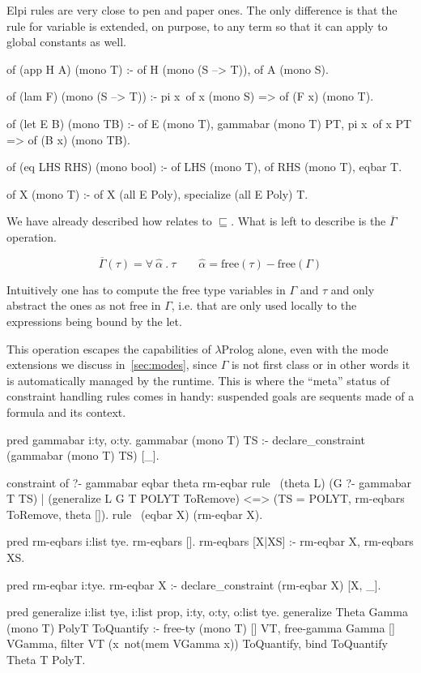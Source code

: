 \documentclass[a4paper, 11pt]{book}
\begin{document}
Elpi rules are very close to pen and paper ones. The only difference is that
the rule for variable is extended, on purpose, to any term so that it
can apply to global constants as well.

\begin{elpicode}
of (app H A) (mono T) :-
  of H (mono (S --> T)),
  of A (mono S).

of (lam F) (mono (S --> T)) :-
  pi x\ of x (mono S) => of (F x) (mono T).

of (let E B) (mono TB) :-
  of E (mono T),
  gammabar (mono T) PT,
  pi x\ of x PT => of (B x) (mono TB).

of (eq LHS RHS) (mono bool) :-
  of LHS (mono T),
  of RHS (mono T),
  eqbar T.

of X (mono T) :- of X (all E Poly), specialize (all E Poly) T.
\end{elpicode}

We have already described how  relates to $\sqsubseteq$.
What is left to describe is the $\overline{\Gamma}$ operation.
  
$$
\overline{\Gamma}(\tau) = \forall\ \hat{\alpha}\ .\ \tau \quad\quad \hat{\alpha} = \textrm{free}(\tau) - \textrm{free}(\Gamma)
$$

Intuitively one has to compute the free type variables in $\Gamma$ and $\tau$
and only abstract the ones as not free in $\Gamma$, i.e. that are only used
locally to the expressions being bound by the let.

This operation escapes the capabilities of $\lambda$Prolog alone, even with
the mode extensions we discuss in~\ref{sec:modes}, since $\Gamma$ is not
first class or in other words it is automatically managed by the runtime.
This is where the ``meta'' status of constraint handling rules comes in
handy: suspended goals are sequents made of a formula and its context.

\begin{elpicode}
pred gammabar i:ty, o:ty.
gammabar (mono T) TS :- declare_constraint (gammabar (mono T) TS) [_].

constraint of ?- gammabar eqbar theta rm-eqbar {
  rule  \ (theta L)
          (G ?- gammabar T TS)              %
        | (generalize L G T POLYT ToRemove) %
      <=> (TS = POLYT, rm-eqbars ToRemove, theta []). %
  rule \ (eqbar X) (rm-eqbar X).
}

pred rm-eqbars i:list tye.
rm-eqbars [].
rm-eqbars [X|XS] :- rm-eqbar X, rm-eqbars XS.

pred rm-eqbar i:tye.
rm-eqbar X :- declare_constraint (rm-eqbar X) [X, _].

pred generalize i:list tye, i:list prop, i:ty, o:ty, o:list tye.
generalize Theta Gamma (mono T) PolyT ToQuantify :-
  free-ty (mono T) [] VT,
  free-gamma Gamma [] VGamma,
  filter VT (x\ not(mem VGamma x)) ToQuantify,
  bind ToQuantify Theta T PolyT.
\end{elpicode}
\end{document}
